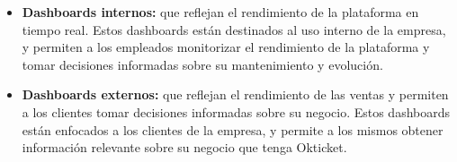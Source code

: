 \begin{itemize}
	\item \textbf{Dashboards internos:} que reflejan el rendimiento de la
		plataforma en tiempo real. Estos dashboards están destinados al uso
		interno de la empresa, y permiten a los empleados monitorizar el
		rendimiento de la plataforma y tomar decisiones informadas sobre su
		mantenimiento y evolución.
	\item \textbf{Dashboards externos:} que reflejan el rendimiento de las
		ventas y permiten a los clientes tomar decisiones informadas sobre su
		negocio. Estos dashboards están enfocados a los clientes de la empresa,
		y permite a los mismos obtener información relevante sobre su negocio
		que tenga Okticket.
\end{itemize}
